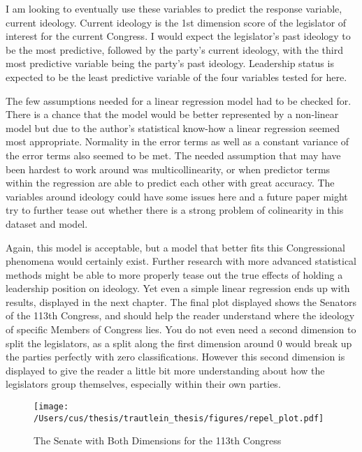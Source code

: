\documentclass[12pt,twoside]{reedthesis}
\begin{document}
  I am looking to eventually use these variables to predict the response
  variable, current ideology. Current ideology is the 1st dimension score
  of the legislator of interest for the current Congress. I would expect
  the legislator's past ideology to be the most predictive, followed by
  the party's current ideology, with the third most predictive variable
  being the party's past ideology. Leadership status is expected to be the
  least predictive variable of the four variables tested for here.
  
  The few assumptions needed for a linear regression model had to be
  checked for. There is a chance that the model would be better
  represented by a non-linear model but due to the author's statistical
  know-how a linear regression seemed most appropriate. Normality in the
  error terms as well as a constant variance of the error terms also
  seemed to be met. The needed assumption that may have been hardest to
  work around was multicollinearity, or when predictor terms within the
  regression are able to predict each other with great accuracy. The
  variables around ideology could have some issues here and a future paper
  might try to further tease out whether there is a strong problem of
  colinearity in this dataset and model.
  
  Again, this model is acceptable, but a model that better fits this
  Congressional phenomena would certainly exist. Further research with
  more advanced statistical methods might be able to more properly tease
  out the true effects of holding a leadership position on ideology. Yet
  even a simple linear regression ends up with results, displayed in the
  next chapter. The final plot displayed shows the Senators of the 113th
  Congress, and should help the reader understand where the ideology of
  specific Members of Congress lies. You do not even need a second
  dimension to split the legislators, as a split along the first dimension
  around 0 would break up the parties perfectly with zero classifications.
  However this second dimension is displayed to give the reader a little
  bit more understanding about how the legislators group themselves,
  especially within their own parties.
  
  \begin{figure}[h!tbp]
  \centering
  \texttt{[image: /Users/cus/thesis/trautlein\_thesis/figures/repel\_plot.pdf]}
  \caption[The Senate with Both Dimensions for the 113th Congress]{\normalsize{The Senate with Both Dimensions for the 113th Congress}}
  \label{fig:def}
  \end{figure}
  
\end{document}
